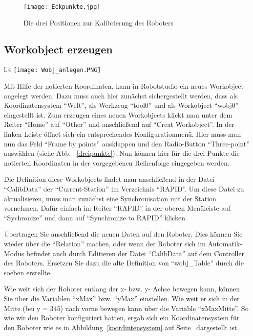 \begin{figure}[htbp]
\centering
\texttt{[image: Eckpunkte.jpg]}
\caption{Die drei Positionen zur Kalibrierung des Roboters} 
\label{eckpunkte}
\end{figure}

\subsection{Workobject erzeugen}

\begin{wrapfigure}{l}{.4\textwidth}
\centering
\texttt{[image: Wobj\_anlegen.PNG]}
\vspace{-15pt}
\caption{Workobject über drei Punkte definieren} 
\label{dreipunkte}
\end{wrapfigure}

Mit Hilfe der notierten Koordinaten, kann in Robotstudio ein neues Workobject angelegt werden. Dazu muss auch hier zunächst sichergestellt werden, dass als Koordinatensystem \enquote{Welt}, als Werkzeug \enquote{tool0} und als Workobject \enquote{wobj0} eingestellt ist. Zum erzeugen eines neuen Workobjects klickt man unter dem Reiter \enquote{Home} auf \enquote{Other} und anschließend auf \enquote{Creat Workobject}. In der linken Leiste öffnet sich ein entsprechendes Konfigurationmenü. Hier muss man nun das Feld \enquote{Frame by points} ausklappen und den Radio-Button \enquote{Three-point} auswählen (siehe Abb. ~\ref{dreipunkte}). Nun können hier für die drei Punkte die notierten Koordinaten  in der vorgegebenen Reihenfolge eingegeben werden.  

Die Definition diese Workobjects findet man anschließend in der Datei \enquote{CalibData} der \enquote{Current-Station} im Verzeichnis \enquote{RAPID}. Um diese Datei zu aktualisieren, muss man zunächst eine Synchronisation mit der Station vornehmen. Dafür einfach im Reiter \enquote{RAPID} in der oberen Menüleiste auf \enquote{Sychronize} und dann auf \enquote{Synchronize to RAPID} klicken. 

Übertragen Sie anschließend die neuen Daten auf den Roboter. Dies können Sie wieder über die \enquote{Relation} machen, oder wenn der Roboter sich im Automatik-Modus befindet auch durch Editieren der Datei \enquote{CalibData} auf dem Controller des Roboters. 
Ersetzen Sie dazu die alte Definition von \enquote{wobj\_Table} durch die soeben erstellte. 

Wie weit sich der Roboter entlang der x- bzw. y- Achse bewegen kann, können Sie über die Variablen \enquote{xMax} bzw. \enquote{yMax} einstellen. Wie weit er sich in der Mitte (bei y = 345) nach vorne bewegen kann über die Variable \enquote{xMaxMitte}. So wie wir den Roboter konfiguriert hatten, ergab sich ein Koordinatensystem für den Roboter wie es in Abbildung~\ref{koordintensystem} auf Seite~\pageref{koordintensystem} dargestellt ist. 


